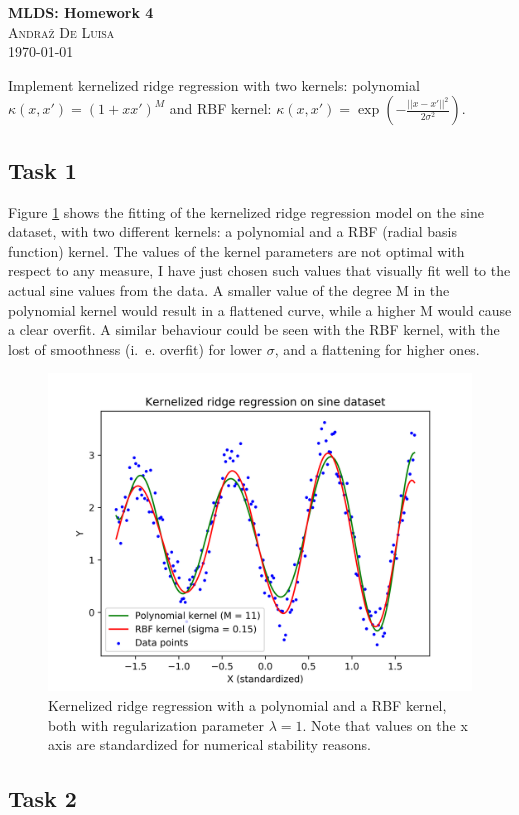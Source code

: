 \documentclass[twocolumn]{article}
\begin{document}
\begin{center}

\Large{\textbf{MLDS: Homework 4}} \\
\textsc{\large{Andraž De Luisa}} \\
\vspace{6pt}
\small{\today}

\end{center}

Implement kernelized ridge regression with two kernels: polynomial $\kappa (x, x') = (1 + x x')^M $ and RBF kernel: $\kappa (x, x') = \exp(- \frac{||x - x'||^2}{2 \sigma^2})$.

\subsection*{Task 1}

Figure \ref{fig:sine} shows the fitting of the kernelized ridge regression model on the sine dataset, with two different kernels: a polynomial and a RBF (radial basis function) kernel. The values of the kernel parameters are not optimal with respect to any measure, I have just chosen such values that visually fit well to the actual sine values from the data. A smaller value of the degree M in the polynomial kernel would result in a flattened curve, while a higher M would cause a clear overfit. A similar behaviour could be seen with the RBF kernel, with the lost of smoothness (i.\ e. overfit) for lower $\sigma$, and a flattening for higher ones.

\begin{figure}[ht]
    \centering
    \includegraphics[width=.4\textwidth]{sine.png}
    \caption{Kernelized ridge regression with a polynomial and a RBF kernel, both with regularization parameter $\lambda = 1$. Note that values on the x axis are standardized for numerical stability reasons.}
    \label{fig:sine}
\end{figure}

\subsection*{Task 2}
\end{document}
